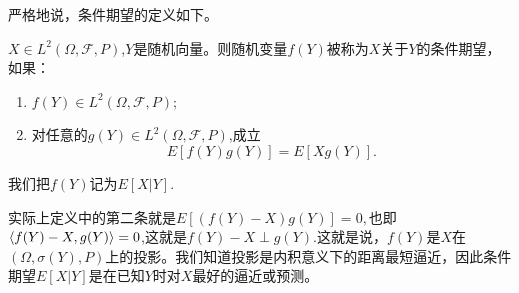 \documentclass[lang=cn,10pt]{elegantbook}
\begin{document}
	严格地说，条件期望的定义如下。
	\begin{definition}[条件期望]
		\(X\in L^2(\Omega,\mathcal{F},P)\),\(Y\)是随机向量。则随机变量\(f(Y)\)被称为\(X\)关于\(Y\)的条件期望，如果：
		\begin{enumerate}
			\item \(f(Y)\in L^2(\Omega,\mathcal{F},P)\);
			\item 对任意的\(g(Y)\in L^2(\Omega,\mathcal{F},P)\),成立
			\[E[f(Y)g(Y)]=E[Xg(Y)].\]
			
		\end{enumerate}
		我们把\(f(Y)\)记为\(E[X|Y]\).
	\end{definition}
	\begin{note}
		实际上定义中的第二条就是\(E[(f(Y)-X)g(Y)]=0,\)也即\(\Braket{f(Y)-X,g(Y)}=0\),这就是\(f(Y)-X\perp g(Y)\).这就是说，\(f(Y)\)是\(X\)在\((\Omega,\sigma(Y),P)\)上的投影。我们知道投影是内积意义下的距离最短逼近，因此条件期望\(E[X|Y]\)是在已知\(Y\)时对\(X\)最好的逼近或预测。
	\end{note}
	
\end{document}
